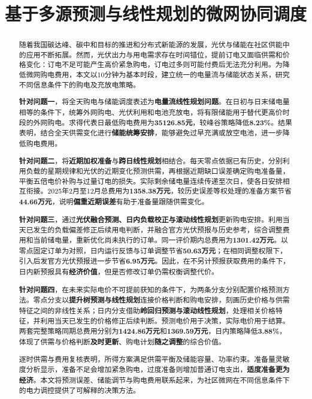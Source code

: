 \title{基于多源预测与线性规划的微网协同调度}
\date{}
\maketitle
\begingroup
{}
\begin{abstract}
\noindent\hspace*{2em}随着我国碳达峰、碳中和目标的推进和分布式新能源的发展，光伏与储能在社区供能中的应用不断拓展。然而，光伏出力与用电需求存在时间错位，提前订电又面临供需和价格变化：订电不足可能产生高价紧急购电，订电过多则可能付费后无法充分利用。为降低微网购电费用，本文以10分钟为基本时段，建立统一的电量流与储能状态关系，研究不同信息条件下的购电及充放电策略。

\textbf{针对问题一}，将全天购电与储能调度表述为\textbf{电量流线性规划问题}。在日初与日末储电量相等的条件下，统筹外网购电、光伏利用和电池充放电，将有限储能用于替代更高价时段的外网购电。求得代表日最低购电费用为\textbf{35126.85元}，较峰谷策略降低\textbf{8.23\%}。结果表明，结合全天供需变化进行\textbf{储能统筹安排}，能够避免过早充满或放空电池，进一步降低购电费用。

\textbf{针对问题二}，将\textbf{近期加权准备}与\textbf{跨日线性规划}相结合。每天零点依据已有历史，分别利用负载的星期规律和光伏的近期变化预测供需，再根据近期缺口误差确定购电准备量，平衡五倍电价补购与过量订电的损失。实际剩余储电量连续传递至次日，使各日安排相互衔接。2025年2月至12月总费用为\textbf{1358.38万元}，较历史误差等权处理的准备方案节省\textbf{44.66万元}，说明\textbf{偏重近期误差}有助于准备量跟随供需变化。

\textbf{针对问题三}，通过\textbf{光伏融合预测、日内负载校正与滚动线性规划}更新购电安排。利用当天已发生的负载偏差修正后续用电判断，并融合官方光伏预报与历史参考，综合调整费用和当前储电量，重新优化尚未执行的订单。同一评价期内总费用为\textbf{1301.42万元}。以零点固定订单为对照，日内运行反馈与订单调整节省\textbf{50.63万元}；在相同调整权限下，引入后发官方光伏预报进一步节省\textbf{6.95万元}。因此，在不另计预报获取费用的条件下，日内新预报具有\textbf{经济价值}，但是否修改订单仍需权衡调整代价。

\textbf{针对问题四}，在未来实际电价不可提前获知的条件下，为两条分支分别配置价格预测方法。零点分支以\textbf{提升树预测与线性规划}连接价格判断和购电安排，刻画历史价格与供需特征之间的非线性关系；日内分支借助\textbf{岭回归预测与滚动线性规划}，处理相关价格特征，并利用当天已发生的价格修正后续判断。预测电价用于决策，实际电价用于结算。两套完整策略同期总费用分别为\textbf{1424.86万元}和\textbf{1369.59万元}，日内策略降低\textbf{3.88\%}，体现了供需与价格判断\textbf{及时更新}、购电计划\textbf{随之调整}的综合价值。

逐时供需与费用复核表明，所得方案满足供需平衡及储能容量、功率约束。准备量灵敏度分析显示，准备不足会增加紧急购电，过度准备则增加普通订电支出，\textbf{适度准备更为经济}。本文将预测误差、储能调节与购电费用联系起来，为社区微网在不同信息条件下的电力调控提供了可解释的决策方法。
\end{abstract}
\par
\endgroup
